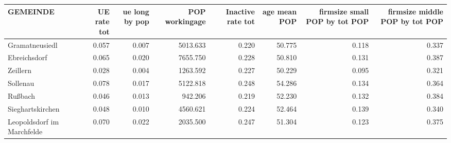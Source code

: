
\begin{tabular}{lrrrrrrr}
\toprule
GEMEINDE & UE rate tot & ue long by pop & POP workingage & Inactive rate tot & age mean POP & firmsize small POP by tot POP & firmsize middle POP by tot POP\\
\midrule
Gramatneusiedl & 0.057 & 0.007 & 5013.633 & 0.220 & 50.775 & 0.118 & 0.337\\
Ebreichsdorf & 0.065 & 0.020 & 7655.750 & 0.228 & 50.810 & 0.131 & 0.387\\
Zeillern & 0.028 & 0.004 & 1263.592 & 0.227 & 50.229 & 0.095 & 0.321\\
Sollenau & 0.078 & 0.017 & 5122.818 & 0.248 & 54.286 & 0.134 & 0.364\\
Rußbach & 0.046 & 0.013 & 942.206 & 0.219 & 52.230 & 0.132 & 0.384\\
Sieghartskirchen & 0.048 & 0.010 & 4560.621 & 0.224 & 52.464 & 0.139 & 0.340\\
Leopoldsdorf im Marchfelde & 0.070 & 0.022 & 2035.500 & 0.247 & 51.304 & 0.123 & 0.375\\
\bottomrule
\end{tabular}

